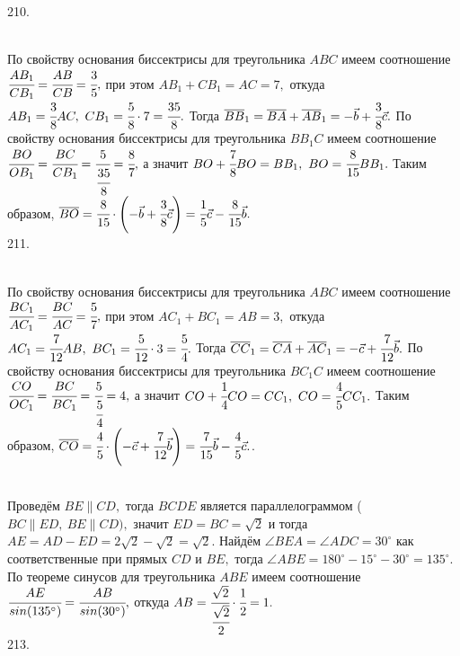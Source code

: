 210. \begin{figure}[ht!]
\end{figure}\\
По свойству основания биссектрисы для треугольника $ABC$ имеем соотношение
$\cfrac{AB_1}{CB_1}=\cfrac{AB}{CB}=\cfrac{3}{5},$ при этом $AB_1+CB_1=AC=7,$ откуда $AB_1=\cfrac{3}{8}AC,\ CB_1=\cfrac{5}{8}\cdot7=\cfrac{35}{8}.$ Тогда $\overline{BB}_1=\overline{BA}+\overline{AB}_1=-\vec{b}+\cfrac{3}{8}\vec{c}.$
По свойству основания биссектрисы для треугольника $BB_1C$ имеем соотношение
$\cfrac{BO}{OB_1}=\cfrac{BC}{CB_1}=\cfrac{5}{\cfrac{35}{8}}=\cfrac{8}{7},$ а значит $BO+\cfrac{7}{8}BO=BB_1,\ BO=\cfrac{8}{15}BB_1.$ Таким образом, $\overline{BO}=\cfrac{8}{15}\cdot\left(-\vec{b}+\cfrac{3}{8}\vec{c}\right)=
\cfrac{1}{5}\vec{c}-\cfrac{8}{15}\vec{b}.$\\
211. \begin{figure}[ht!]
\end{figure}\\
По свойству основания биссектрисы для треугольника $ABC$ имеем соотношение
$\cfrac{BC_1}{AC_1}=\cfrac{BC}{AC}=\cfrac{5}{7},$ при этом $AC_1+BC_1=AB=3,$ откуда $AC_1=\cfrac{7}{12}AB,\ BC_1=\cfrac{5}{12}\cdot3=\cfrac{5}{4}.$ Тогда $\overline{CC}_1=\overline{CA}+\overline{AC}_1=-\vec{c}+\cfrac{7}{12}\vec{b}.$
По свойству основания биссектрисы для треугольника $BC_1C$ имеем соотношение
$\cfrac{CO}{OC_1}=\cfrac{BC}{BC_1}=\cfrac{5}{\cfrac{5}{4}}=4,$ а значит $CO+\cfrac{1}{4}CO=CC_1,\ CO=\cfrac{4}{5}CC_1.$ Таким образом, $\overline{CO}=\cfrac{4}{5}\cdot\left(-\vec{c}+\cfrac{7}{12}\vec{b}\right)=
\cfrac{7}{15}\vec{b}-\cfrac{4}{5}\vec{c}.$\newpage{}. \begin{figure}[ht!]
\end{figure}\\
Проведём $BE\parallel CD,$ тогда $BCDE$ является параллелограммом ($BC\parallel ED,\ BE\parallel CD),$ значит $ED=BC=\sqrt{2}$ и тогда $AE=AD-ED=2\sqrt{2}-\sqrt{2}=\sqrt{2}.$ Найдём $\angle BEA=\angle ADC=30^\circ$ как соответственные при прямых $CD$ и $BE,$ тогда $\angle ABE=180^\circ-15^\circ-30^\circ=135^\circ.$ По теореме синусов для треугольника $ABE$ имеем соотношение $\cfrac{AE}{sin(135^\circ)}=\cfrac{AB}{sin(30^\circ)},$ откуда $AB=\cfrac{\sqrt{2}}{\cfrac{\sqrt{2}}{2}}\cdot\cfrac{1}{2}=1.$\\
213. \begin{figure}[ht!]
\end{figure}\\

